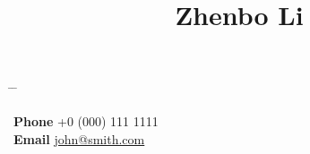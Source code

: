 

\title{Zhenbo Li} %

\parbox[c][3em][t]{0.9\textwidth}{ %
	\begin{tabbing} %
		\hspace{3cm} \= \hspace{4cm} \= \kill %
		
{\bf Phone} \> +0 (000) 111 1111 \\ %
{\bf Email} \> \href{mailto:john@smith.com}{john@smith.com} \\ %
		
	\end{tabbing}
}

